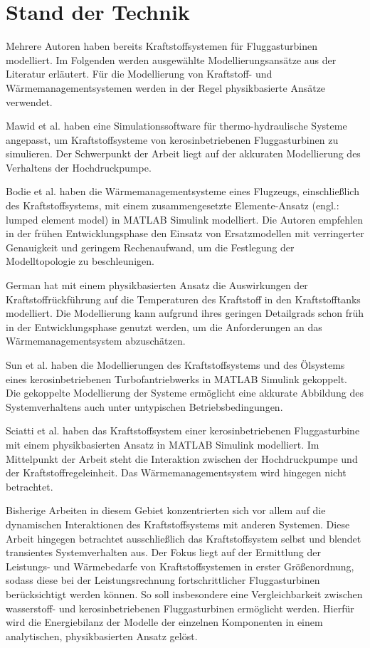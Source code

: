 \chapter{Stand der Technik}\label{chap:standdertechnik}

Mehrere Autoren haben bereits Kraftstoffsystemen für Fluggasturbinen modelliert. Im Folgenden werden ausgewählte Modellierungsansätze aus der Literatur erläutert. Für die Modellierung von Kraftstoff- und Wärmemanagementsystemen werden in der Regel physikbasierte Ansätze verwendet.

Mawid et al. \cite{Mawid.1998} haben eine Simulationssoftware für thermo-hydraulische Systeme angepasst, um  Kraftstoffsysteme von kerosinbetriebenen Fluggasturbinen zu simulieren. Der Schwerpunkt der Arbeit liegt auf der akkuraten Modellierung des Verhaltens der Hochdruckpumpe.

Bodie et al. \cite{Bodie.2010} haben die Wärmemanagementsysteme eines Flugzeugs, einschließlich des Kraftstoffsystems, mit einem zusammengesetzte Elemente-Ansatz (engl.: lumped element model) in MATLAB Simulink modelliert. Die Autoren empfehlen in der frühen Entwicklungsphase den Einsatz von Ersatzmodellen mit verringerter Genauigkeit und geringem Rechenaufwand, um die Festlegung der Modelltopologie zu beschleunigen.

German \cite{German.2012} hat mit einem physikbasierten Ansatz die Auswirkungen der Kraftstoffrückführung auf die Temperaturen des Kraftstoff in den Kraftstofftanks modelliert. Die Modellierung kann aufgrund ihres geringen Detailgrads schon früh in der Entwicklungsphase genutzt werden, um die Anforderungen an das Wärmemanagementsystem abzuschätzen.

Sun et al. \cite{Sun.2019} haben die Modellierungen des Kraftstoffsystems und des Ölsystems eines kerosinbetriebenen Turbofantriebwerks in MATLAB Simulink gekoppelt. Die gekoppelte Modellierung der Systeme ermöglicht eine akkurate Abbildung des Systemverhaltens auch unter untypischen Betriebsbedingungen.

Sciatti et al. \cite{Sciatti.2022} haben das Kraftstoffsystem einer kerosinbetriebenen Fluggasturbine mit einem physikbasierten Ansatz in MATLAB Simulink modelliert. Im Mittelpunkt der Arbeit steht die Interaktion zwischen der Hochdruckpumpe und der Kraftstoffregeleinheit. Das Wärmemanagementsystem wird hingegen nicht betrachtet. 

Bisherige Arbeiten in diesem Gebiet konzentrierten sich vor allem auf die dynamischen Interaktionen des Kraftstoffsystems mit anderen Systemen. Diese Arbeit hingegen betrachtet ausschließlich das Kraftstoffsystem selbst und blendet transientes Systemverhalten aus. Der Fokus liegt auf der Ermittlung der Leistungs- und Wärmebedarfe von Kraftstoffsystemen in erster Größenordnung, sodass diese bei der Leistungsrechnung fortschrittlicher Fluggasturbinen berücksichtigt werden können. So soll insbesondere eine Vergleichbarkeit zwischen wasserstoff- und kerosinbetriebenen Fluggasturbinen ermöglicht werden. Hierfür wird die Energiebilanz der Modelle der einzelnen Komponenten in einem analytischen, physikbasierten Ansatz gelöst. 